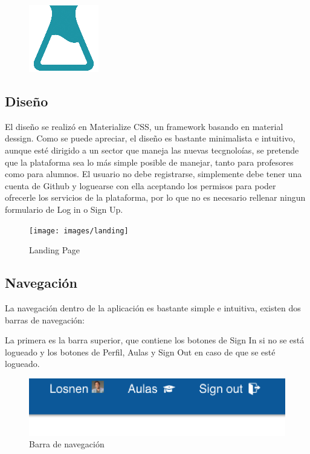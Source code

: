 \begin{figure}[!th]
\begin{center}
\includegraphics[scale=1.0]{images/probeta}
\end{center}
\end{figure}

\subsection{Diseño}
\label{3:5:1}

El diseño se realizó en Materialize CSS, un framework basando en material dessign. Como se puede apreciar, el diseño es bastante minimalista e intuitivo, aunque esté dirigido a un sector que maneja las nuevas tecgnoloías, se pretende que la plataforma sea lo más simple posible de manejar, tanto para profesores como para alumnos.
El usuario no debe registrarse, simplemente debe tener una cuenta de Github y loguearse con ella aceptando los permisos para poder ofrecerle los servicios de la plataforma, por lo que no es necesario rellenar ningun formulario de Log in o Sign Up.


\begin{figure}[!th]
\begin{center}
\texttt{[image: images/landing]}
\caption{Landing Page}
\label{fig:Landing page}
\end{center}
\end{figure}

\newpage

\subsection{Navegación}
\label{3:5:2}

La navegación dentro de la aplicación es bastante simple e intuitiva, existen dos barras de navegación:

La primera es la barra superior, que contiene los botones de Sign In si no se está logueado y los botones de Perfil, Aulas y Sign Out en caso de que se esté logueado.

\begin{figure}[!th]
\begin{center}
\includegraphics[scale=0.8]{images/nav}
\caption{Barra de navegación}
\label{fig:Barra de navegacion}
\end{center}
\end{figure}

